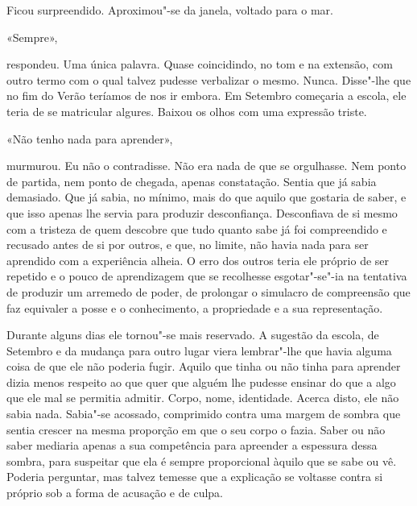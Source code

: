 Ficou surpreendido. Aproximou"-se da janela, voltado para o mar.

«Sempre»,

respondeu. Uma única palavra. Quase coincidindo, no tom e na extensão,
com outro termo com o qual talvez pudesse verbalizar o mesmo. Nunca.
Disse"-lhe que no fim do Verão teríamos de nos ir embora. Em Setembro
começaria a escola, ele teria de se matricular algures. Baixou os olhos
com uma expressão triste.

«Não tenho nada para aprender»,

murmurou. Eu não o contradisse. Não era nada de que se orgulhasse. Nem
ponto de partida, nem ponto de chegada, apenas constatação. Sentia que
já sabia demasiado. Que já sabia, no mínimo, mais do que aquilo que
gostaria de saber, e que isso apenas lhe servia para produzir
desconfiança. Desconfiava de si mesmo com a tristeza de quem descobre
que tudo quanto sabe já foi compreendido e recusado antes de si por
outros, e que, no limite, não havia nada para ser aprendido com a
experiência alheia. O erro dos outros teria ele próprio de ser repetido
e o pouco de aprendizagem que se recolhesse esgotar"-se"-ia na tentativa
de produzir um arremedo de poder, de prolongar o simulacro de
compreensão que faz equivaler a posse e o conhecimento, a propriedade e
a sua representação.

Durante alguns dias ele tornou"-se mais reservado. A sugestão da escola,
de Setembro e da mudança para outro lugar viera lembrar"-lhe que havia
alguma coisa de que ele não poderia fugir. Aquilo que tinha ou não tinha
para aprender dizia menos respeito ao que quer que alguém lhe pudesse
ensinar do que a algo que ele mal se permitia admitir. Corpo, nome,
identidade. Acerca disto, ele não sabia nada. Sabia"-se acossado,
comprimido contra uma margem de sombra que sentia crescer na mesma
proporção em que o seu corpo o fazia. Saber ou não saber mediaria apenas
a sua competência para apreender a espessura dessa sombra, para
suspeitar que ela é sempre proporcional àquilo que se sabe ou vê.
Poderia perguntar, mas talvez temesse que a explicação se voltasse
contra si próprio sob a forma de acusação e de culpa.

